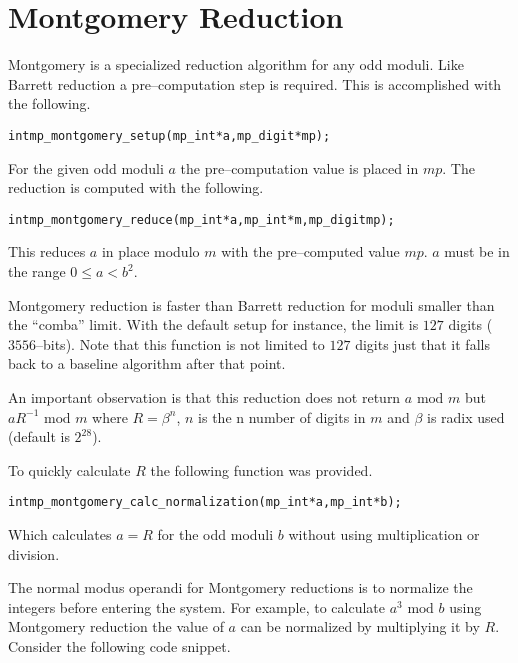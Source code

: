\documentclass[synpaper]{book}
\begin{document}
\section{Montgomery Reduction}

Montgomery is a specialized reduction algorithm for any odd moduli.  Like Barrett reduction a pre--computation
step is required.  This is accomplished with the following.

\begin{alltt}
int mp_montgomery_setup(mp_int *a, mp_digit *mp);
\end{alltt}

For the given odd moduli $a$ the pre--computation value is placed in $mp$.  The reduction is computed with the
following.

\begin{alltt}
int mp_montgomery_reduce(mp_int *a, mp_int *m, mp_digit mp);
\end{alltt}
This reduces $a$ in place modulo $m$ with the pre--computed value $mp$.   $a$ must be in the range
$0 \le a < b^2$.

Montgomery reduction is faster than Barrett reduction for moduli smaller than the ``comba'' limit.  With the default
setup for instance, the limit is $127$ digits ($3556$--bits).   Note that this function is not limited to
$127$ digits just that it falls back to a baseline algorithm after that point.

An important observation is that this reduction does not return $a \mbox{ mod }m$ but $aR^{-1} \mbox{ mod }m$
where $R = \beta^n$, $n$ is the n number of digits in $m$ and $\beta$ is radix used (default is $2^{28}$).

To quickly calculate $R$ the following function was provided.

\begin{alltt}
int mp_montgomery_calc_normalization(mp_int *a, mp_int *b);
\end{alltt}
Which calculates $a = R$ for the odd moduli $b$ without using multiplication or division.

The normal modus operandi for Montgomery reductions is to normalize the integers before entering the system.  For
example, to calculate $a^3 \mbox { mod }b$ using Montgomery reduction the value of $a$ can be normalized by
multiplying it by $R$.  Consider the following code snippet.
\end{document}
